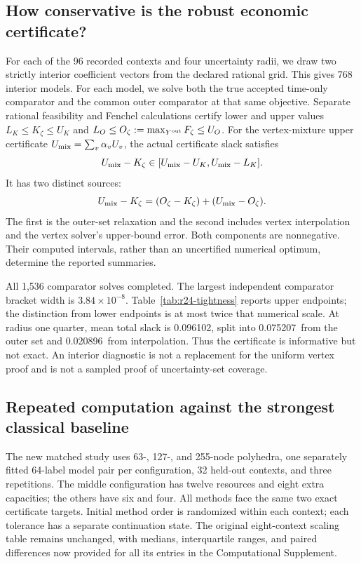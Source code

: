 \documentclass[11pt,letterpaper]{article}
\theoremstyle{definition}
\newcommand{\1}{\mathbf 1}
\newcommand{\RTwentyFourInteriorGap}{\ensuremath{3.84\times10^{-8}}}
\newcommand{\RTwentyFourSlackTotal}{0.096102}
\newcommand{\RTwentyFourSlackOuter}{0.075207}
\newcommand{\RTwentyFourSlackInterpolation}{0.020896}
\begin{document}
\subsection{How conservative is the robust economic certificate?}
For each of the 96 recorded contexts and four uncertainty radii, we draw two
strictly interior coefficient vectors from the declared rational grid. This
gives 768 interior models. For each model, we solve both the true accepted
time-only comparator and the common outer comparator at that same objective.
Separate rational feasibility and Fenchel calculations certify lower and upper
values $L_K\leq K_\zeta\leq U_K$ and
$L_O\leq O_\zeta:=\max_{Y^{\rm out}}F_\zeta\leq U_O$.
For the vertex-mixture upper certificate
$U_{\rm mix}=\sum_v\alpha_vU_v$, the actual certificate slack satisfies
\[
 U_{\rm mix}-K_\zeta\in[U_{\rm mix}-U_K,U_{\rm mix}-L_K].
\]
It has two distinct sources:
\[
 U_{\rm mix}-K_\zeta=(O_\zeta-K_\zeta)+(U_{\rm mix}-O_\zeta).
\]
The first is the outer-set relaxation and the second includes vertex
interpolation and the vertex solver's upper-bound error. Both components are
nonnegative. Their computed intervals, rather than an uncertified numerical
optimum, determine the reported summaries.

All 1,536 comparator solves completed. The largest independent comparator
bracket width is \RTwentyFourInteriorGap. Table~\ref{tab:r24-tightness} reports
upper endpoints; the distinction from lower endpoints is at most twice that numerical
scale. At radius one quarter, mean total slack is
\RTwentyFourSlackTotal, split into \RTwentyFourSlackOuter\ from the outer set
and \RTwentyFourSlackInterpolation\ from interpolation. Thus the certificate
is informative but not exact. An interior diagnostic is not a replacement for
the uniform vertex proof and is not a sampled proof of uncertainty-set coverage.

\subsection{Repeated computation against the strongest classical baseline}
The new matched study uses 63-, 127-, and 255-node polyhedra, one separately
fitted 64-label model pair per configuration, 32 held-out contexts, and three
repetitions. The middle configuration has twelve resources and eight extra
capacities; the others have six and four. All methods face the same two exact
certificate targets. Initial method order is randomized within each context;
each tolerance has a separate continuation state. The original eight-context
scaling table remains unchanged, with medians, interquartile ranges, and paired
differences now provided for all its entries in the Computational Supplement.
\end{document}
